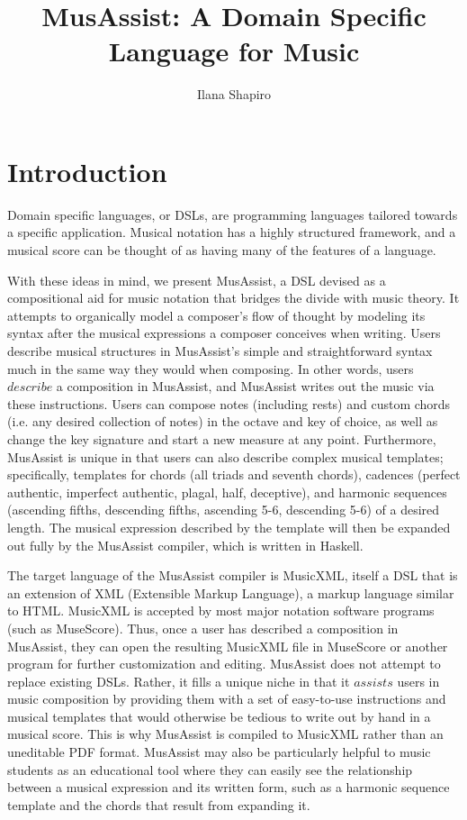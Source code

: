 \documentclass{report}
\title{MusAssist: A Domain Specific Language for Music }
\author{Ilana Shapiro}
\begin{document}
\maketitle

\tableofcontents

\chapter{Introduction}

Domain specific languages, or DSLs, are programming languages tailored towards a specific application. Musical notation has a highly structured framework, and a musical score can be thought of as having many of the features of a language. 

With these ideas in mind, we present MusAssist, a DSL devised as a compositional aid for music notation that bridges the divide with music theory. It attempts to organically model a composer's flow of thought by modeling its syntax after the musical expressions a composer conceives when writing. Users describe musical structures in MusAssist's simple and straightforward syntax much in the same way they would when composing. In other words, users $describe$ a composition in MusAssist, and MusAssist writes out the music via these instructions. Users can compose notes (including rests) and custom chords (i.e. any desired collection of notes) in the octave and key of choice, as well as change the key signature and start a new measure at any point. Furthermore, MusAssist is unique in that users can also describe complex musical templates; specifically, templates for chords (all triads and seventh chords), cadences (perfect authentic, imperfect authentic, plagal, half, deceptive), and harmonic sequences (ascending fifths, descending fifths, ascending 5-6, descending 5-6) of a desired length. The musical expression described by the template will then be expanded out fully by the MusAssist compiler, which is written in Haskell.

The target language of the MusAssist compiler is MusicXML, itself a DSL that is an extension of  XML (Extensible Markup Language), a markup language similar to HTML. MusicXML is accepted by most major notation software programs (such as MuseScore). Thus, once a user has described a composition in MusAssist, they can open the resulting MusicXML file in MuseScore or another program for further customization and editing. MusAssist does not attempt to replace existing DSLs. Rather, it fills a unique niche in that it $assists$ users in music composition by providing them with a set of easy-to-use instructions and musical templates that would otherwise be tedious to write out by hand in a musical score. This is why MusAssist is compiled to MusicXML rather than an uneditable PDF format. MusAssist may also be particularly helpful to music students as an educational tool where they can easily see the relationship between a musical expression and its written form, such as a harmonic sequence template and the chords that result from expanding it.
\end{document}
